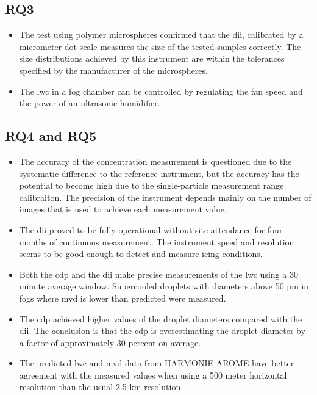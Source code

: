 \subsection{RQ3}
\reqthree
\begin{itemize}
\item The test using polymer microspheres confirmed that the \gls{dii}, calibrated by a micrometer dot scale measures the size of the tested samples correctly. The size distributions achieved by this instrument are within the tolerances specified by the manufacturer of the microspheres.
\item The \gls{lwc} in a fog chamber can be controlled by regulating the fan speed and the power of an ultrasonic humidifier.
\end{itemize}

\subsection{RQ4 and RQ5}
\reqfour
\reqfive
\begin{itemize}
\item The accuracy of the concentration measurement is questioned due to the systematic difference to the reference instrument, but the accuracy has the potential to become high due to the single-particle measurement range calibraiton. The precision of the instrument depends mainly on the number of images that is used to achieve each measurement value.
\item The \gls{dii} proved to be fully operational without site attendance for four months of continuous measurement. The instrument speed and resolution seems to be good enough to detect and measure icing conditions.
\item Both the \gls{cdp} and the \gls{dii} make precise measurements of the \gls{lwc} using a 30 minute average window. Supercooled droplets with diameters above 50 µm in fogs where \gls{mvd} is lower than predicted were measured.
\item The \gls{cdp} achieved higher values of the droplet diameters compared with the \gls{dii}. The conclusion is that the \gls{cdp} is overestimating the droplet diameter by a factor of approximately 30 percent on average.
\item The predicted \gls{lwc} and \gls{mvd} data from HARMONIE-AROME have better agreement with the measured values when using a 500 meter horizontal resolution than the usual 2.5 km resolution.
\end{itemize}


